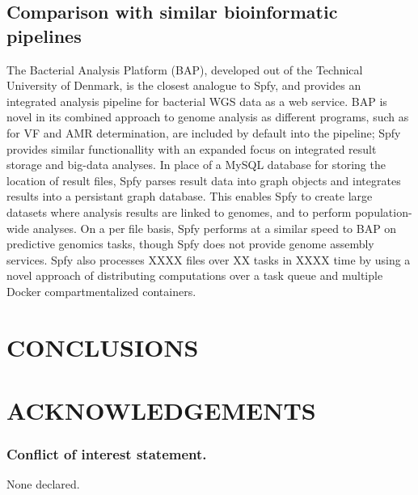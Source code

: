 \documentclass[a4,center,fleqn]{NAR}
\begin{document}
\subsection{Comparison with similar bioinformatic pipelines}



The Bacterial Analysis Platform (BAP), developed out of the Technical University of Denmark, is the closest analogue to Spfy, and provides an integrated analysis pipeline for bacterial WGS data as a web service.
BAP is novel in its combined approach to genome analysis as different programs, such as for VF and AMR determination, are included by default into the pipeline; Spfy provides similar functionallity with an expanded focus on integrated result storage and big-data analyses.
In place of a MySQL database for storing the location of result files, Spfy parses result data into graph objects and integrates results into a persistant graph database.
This enables Spfy to create large datasets where analysis results are linked to genomes, and to perform population-wide analyses.
On a per file basis, Spfy performs at a similar speed to BAP on predictive genomics tasks, though Spfy does not provide genome assembly services.
Spfy also processes XXXX files over XX tasks in XXXX time by using a novel approach of distributing computations over a task queue and multiple Docker compartmentalized containers.

\section{CONCLUSIONS}

\section{ACKNOWLEDGEMENTS}


\subsubsection{Conflict of interest statement.} None declared.
\newpage
\end{document}
